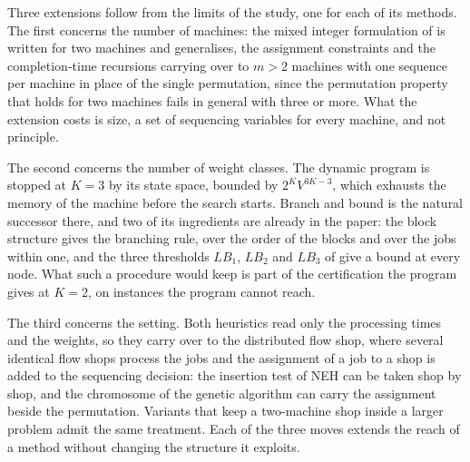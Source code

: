 \documentclass[12pt]{article}
\begin{document}
\begin{sloppypar}
        Three extensions follow from the limits of the study, one for each of its methods. The first
        concerns the number of machines: the mixed integer formulation of  is
        written for two machines and generalises, the assignment constraints and the completion-time
        recursions carrying over to $m>2$ machines with one sequence per machine in place of the single
        permutation, since the permutation property that holds for two machines fails in general with
        three or more. What the extension costs is size, a set of sequencing variables for every machine,
        and not principle.
        
        The second concerns the number of weight classes. The dynamic program is stopped at $K=3$ by its
        state space, bounded by $2^{K}V^{3K-3}$, which exhausts the memory of the machine before the search
        starts. Branch and bound is the natural successor there, and two of its ingredients are already in
        the paper: the block structure gives the branching rule, over the order of the blocks and over the
        jobs within one, and the three thresholds $LB_1$, $LB_2$ and $LB_3$ of  give a
        bound at every node. What such a procedure would keep is part of the certification the program
        gives at $K=2$, on instances the program cannot reach.
        
        The third concerns the setting. Both heuristics read only the processing times and the weights, so
        they carry over to the distributed flow shop, where several identical flow shops process the jobs
        and the assignment of a job to a shop is added to the sequencing decision: the insertion test of
        NEH can be taken shop by shop, and the chromosome of the genetic algorithm can carry the assignment
        beside the permutation. Variants that keep a two-machine shop inside a larger problem admit the
        same treatment. Each of the three moves extends the reach of a method without changing the
        structure it exploits.
        
        
        
        
    \end{sloppypar}
\end{document}
